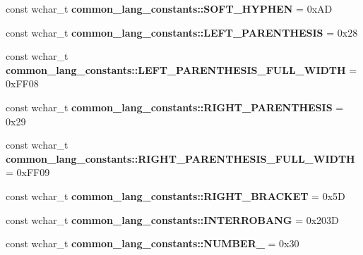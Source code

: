 \begin{DoxyCompactItemize}
\item 
\hypertarget{group___indexing_ga4d2bb55132aae435e573df6d7a5df188}{const wchar\-\_\-t {\bfseries common\-\_\-lang\-\_\-constants\-::\-S\-O\-F\-T\-\_\-\-H\-Y\-P\-H\-E\-N} = 0x\-A\-D}\label{group___indexing_ga4d2bb55132aae435e573df6d7a5df188}

\item 
\hypertarget{group___indexing_ga46f83a989464b1843903d63f4bc442b4}{const wchar\-\_\-t {\bfseries common\-\_\-lang\-\_\-constants\-::\-L\-E\-F\-T\-\_\-\-P\-A\-R\-E\-N\-T\-H\-E\-S\-I\-S} = 0x28}\label{group___indexing_ga46f83a989464b1843903d63f4bc442b4}

\item 
\hypertarget{group___indexing_ga0b8bd5680f27487ecfa3c99a592d0c17}{const wchar\-\_\-t {\bfseries common\-\_\-lang\-\_\-constants\-::\-L\-E\-F\-T\-\_\-\-P\-A\-R\-E\-N\-T\-H\-E\-S\-I\-S\-\_\-\-F\-U\-L\-L\-\_\-\-W\-I\-D\-T\-H} = 0x\-F\-F08}\label{group___indexing_ga0b8bd5680f27487ecfa3c99a592d0c17}

\item 
\hypertarget{group___indexing_ga22dd9f8ece9f8b43141b5211692ac0b5}{const wchar\-\_\-t {\bfseries common\-\_\-lang\-\_\-constants\-::\-R\-I\-G\-H\-T\-\_\-\-P\-A\-R\-E\-N\-T\-H\-E\-S\-I\-S} = 0x29}\label{group___indexing_ga22dd9f8ece9f8b43141b5211692ac0b5}

\item 
\hypertarget{group___indexing_ga568d40ea261352120d1504e72aeab062}{const wchar\-\_\-t {\bfseries common\-\_\-lang\-\_\-constants\-::\-R\-I\-G\-H\-T\-\_\-\-P\-A\-R\-E\-N\-T\-H\-E\-S\-I\-S\-\_\-\-F\-U\-L\-L\-\_\-\-W\-I\-D\-T\-H} = 0x\-F\-F09}\label{group___indexing_ga568d40ea261352120d1504e72aeab062}

\item 
\hypertarget{group___indexing_ga15b5685be6c1a08a2798c8cabcfe666f}{const wchar\-\_\-t {\bfseries common\-\_\-lang\-\_\-constants\-::\-R\-I\-G\-H\-T\-\_\-\-B\-R\-A\-C\-K\-E\-T} = 0x5\-D}\label{group___indexing_ga15b5685be6c1a08a2798c8cabcfe666f}

\item 
\hypertarget{group___indexing_ga8811ed3c2e77e124080c4918e37896c9}{const wchar\-\_\-t {\bfseries common\-\_\-lang\-\_\-constants\-::\-I\-N\-T\-E\-R\-R\-O\-B\-A\-N\-G} = 0x203\-D}\label{group___indexing_ga8811ed3c2e77e124080c4918e37896c9}

\item 
\hypertarget{group___indexing_gafb4499a40da5432310a513f15bfbb3ec}{const wchar\-\_\-t {\bfseries common\-\_\-lang\-\_\-constants\-::\-N\-U\-M\-B\-E\-R\-\_} = 0x30}\label{group___indexing_gafb4499a40da5432310a513f15bfbb3ec}


\end{DoxyCompactItemize}
